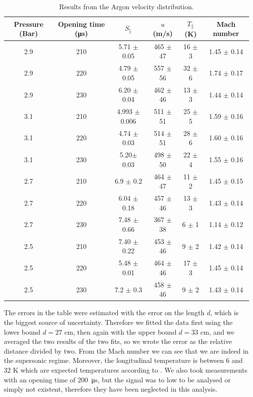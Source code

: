 \documentclass[a4paper,10pt]{article}
\begin{document}
\begin{table}[H]
\centering
\caption{Results from the Argon velocity distribution.}
\begin{tabular}{cccccc} \toprule
Pressure (Bar) & Opening time (\si{\micro \s}) & $S_\parallel$ & $u$ (m/s) & $T_\parallel$ (K) & Mach number \\ \midrule

2.9 & 210 & 5.71 $\pm$ 0.05 & 465 $\pm$ 47 & 16 $\pm$ 3 & 1.45 $\pm$ 0.14 \\
2.9 & 220 & 4.79 $\pm$ 0.05 & 557 $\pm$ 56 & 32 $\pm$ 6 & 1.74 $\pm$ 0.17 \\
2.9 & 230 & 6.20 $\pm$ 0.04 & 462 $\pm$ 46 & 13 $\pm$ 3 & 1.44 $\pm$ 0.14 \\ \midrule
3.1 & 210 & 4.993 $\pm$ 0.006 & 511 $\pm$ 51 & 25 $\pm$ 5 & 1.59 $\pm$ 0.16 \\
3.1 & 220 & 4.74 $\pm$ 0.03 & 514 $\pm$ 51 & 28 $\pm$ 6 & 1.60 $\pm$ 0.16 \\
3.1 & 230 & 5.20$\pm$ 0.03 & 498 $\pm$ 50 & 22 $\pm$ 4 & 1.55 $\pm$ 0.16 \\
\midrule
2.7 & 210 & 6.9 $\pm$ 0.2 & 464 $\pm$ 47 & 11 $\pm$ 2 & 1.45 $\pm$ 0.15\\
2.7 & 220 & 6.04 $\pm$ 0.18 & 457 $\pm$ 46 & 13 $\pm$ 3 & 1.43 $\pm$ 0.14\\
2.7 & 230 & 7.48 $\pm$ 0.66 & 367 $\pm$ 38 & 6 $\pm$ 1 & 1.14 $\pm$ 0.12\\ 
\midrule
2.5 & 210 & 7.40 $\pm$ 0.22 & 453 $\pm$ 46& 9 $\pm$ 2 & 1.42 $\pm$ 0.14 \\
2.5 & 220 & 5.48 $\pm$ 0.01 & 464 $\pm$ 46 & 17 $\pm$ 3 & 1.45 $\pm$ 0.14 \\
2.5 & 230 & 7.2 $\pm$ 0.3 & 458 $\pm$ 46 & 9 $\pm$ 2 & 1.43 $\pm$ 0.14 \\ \bottomrule
\end{tabular}
\end{table}
The errors in the table were estimated with the error on the length $d$, which is the biggest source of uncertainty. Therefore we fitted the data first using the lower bound $d = 27$ cm, then again with the upper bound $d= 33$ cm, and we averaged the two results of the two fits, so we wrote the error as the relative distance divided by two. From the Mach number we can see that we are indeed in the supersonic regime. Moreover, the longitudinal temperature is between 6 and 32 K which are expected temperatures according to \cite{illinois}. We also took measurements with an opening time of \SI{200}{\micro \s}, but the signal was to low to be analysed or simply not existent, therefore they have been neglected in this analysis.
\end{document}
